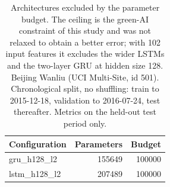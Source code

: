 \begin{table}[htbp]
\caption{Architectures excluded by the parameter budget. The ceiling is the green-AI constraint of this study and was not relaxed to obtain a better error; with 102 input features it excludes the wider LSTMs and the two-layer GRU at hidden size 128. Beijing Wanliu (UCI Multi-Site, id 501). Chronological split, no shuffling: train to 2015-12-18, validation to 2016-07-24, test thereafter. Metrics on the held-out test period only.}
\label{tab:green_excluded_configs}
\begin{tabular}{lrr}
\toprule
Configuration & Parameters & Budget \\
\midrule
gru\_h128\_l2 & 155649 & 100000 \\
lstm\_h128\_l2 & 207489 & 100000 \\
\bottomrule
\end{tabular}
\end{table}
